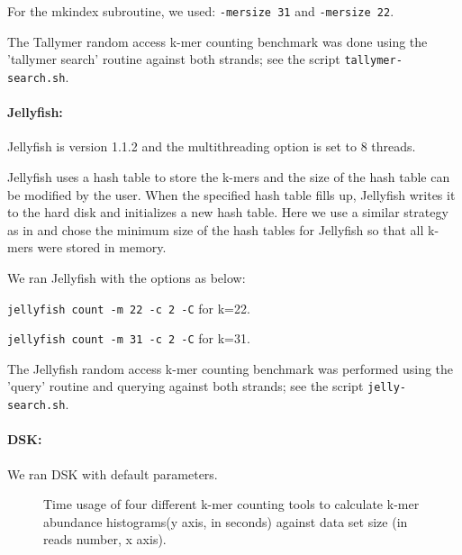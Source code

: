 \documentclass{article}
\begin{document}
For the mkindex subroutine, we used: {\tt -mersize 31} and {\tt -mersize 22}.

The Tallymer random access k-mer counting benchmark was done using the
'tallymer search' routine against both strands; see the script
{\tt tallymer-search.sh}.

\paragraph{Jellyfish:}
Jellyfish is version 1.1.2 and the multithreading option is set to 8 threads.

Jellyfish uses a hash table to store the k-mers and the size of the
hash table can be modified by the user.  When the specified hash table
fills up, Jellyfish writes it to the hard
disk and initializes a new hash table.  Here we use a
similar strategy as in \cite{Melsted2011} and chose the minimum size of the hash 
tables for Jellyfish so that all k-mers were stored in memory.

We ran Jellyfish with the options as below:

{\tt jellyfish count -m 22 -c 2 -C} for k=22.

{\tt jellyfish count -m 31 -c 2 -C} for k=31.

The Jellyfish random access k-mer counting benchmark was performed
using the 'query' routine and querying against both strands; see
the script {\tt jelly-search.sh}.

\paragraph{DSK:} We ran DSK with default parameters.








\begin{figure}
\caption{Time usage of four different k-mer counting tools to calculate k-mer abundance histograms(y axis, in seconds) against data set size (in reads number, x axis).}
\label{cmp_time}
\end{figure}
\end{document}
